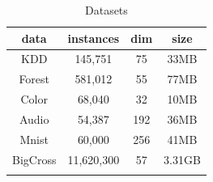 \begin{table}[!htb]
\vspace{-0.1in}
    \caption{Datasets}
    \vspace{-0.15in}
    \label{tab:data}
    \centering
    \small
    \begin{tabular}{c|c|c|c}
    \hline
   data & instances & dim & size\\
\hline\hline
KDD & 145,751 & 75 & 33MB\\
\hline
Forest & 581,012 & 55 & 77MB \\
\hline
Color & 68,040 & 32 & 10MB \\
\hline
Audio & 54,387 & 192 & 36MB\\
\hline
Mnist & 60,000 & 256 & 41MB\\
\hline
BigCross & 11,620,300 & 57 & 3.31GB\\
\hline
\vspace{-0.2in}
\end{tabular}
\end{table}

